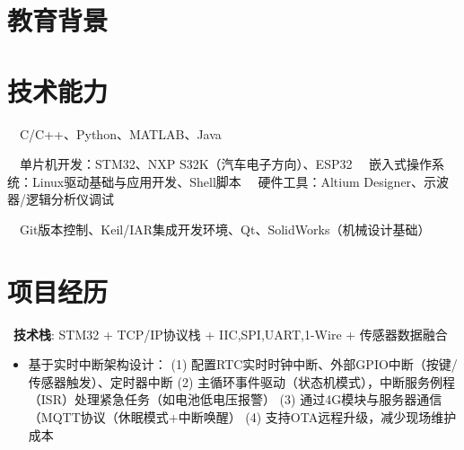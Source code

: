 \documentclass{resume}
\begin{document}



\section{教育背景}


\section{技术能力}
\ \ C/C++、Python、MATLAB、Java

\ \ 单片机开发：STM32、NXP S32K（汽车电子方向）、ESP32 
\ \ 嵌入式操作系统：Linux驱动基础与应用开发、Shell脚本
\ \ 硬件工具：Altium Designer、示波器/逻辑分析仪调试  

\ \ Git版本控制、Keil/IAR集成开发环境、Qt、SolidWorks（机械设计基础）  


\section{项目经历}
\ \textbf{技术栈}: STM32 + TCP/IP协议栈 + IIC,SPI,UART,1-Wire + 传感器数据融合  
\ \begin{itemize}  
	\item 基于实时中断架构设计：  
	(1) 配置RTC实时时钟中断、外部GPIO中断（按键/传感器触发）、定时器中断  
	(2) 主循环事件驱动（状态机模式），中断服务例程（ISR）处理紧急任务（如电池低电压报警）   
	(3) 通过4G模块与服务器通信（MQTT协议（休眠模式+中断唤醒）  
	(4) 支持OTA远程升级，减少现场维护成本 
	
\end{itemize}  
\end{document}

